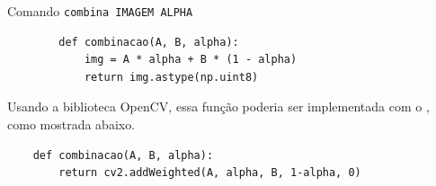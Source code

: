 \begin{listing}[H]
    \caption{Comando \texttt{combina IMAGEM ALPHA}}

    \begin{verbatim}
        def combinacao(A, B, alpha):
            img = A * alpha + B * (1 - alpha)
            return img.astype(np.uint8)
    \end{verbatim}
\end{listing}

Usando a biblioteca OpenCV, essa função poderia ser implementada com o  \autocite{ref:addweighted}, como mostrada abaixo.

\begin{verbatim}
    def combinacao(A, B, alpha):
        return cv2.addWeighted(A, alpha, B, 1-alpha, 0)
\end{verbatim}
